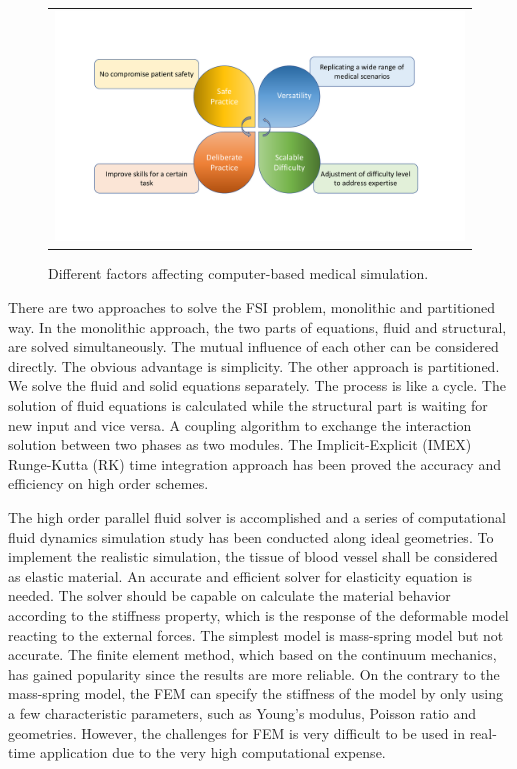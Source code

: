 \begin{figure}[H]
	\centering
	\begin{tabular}{c}
		\includegraphics[width=1.0\textwidth]{./pics/computer_simulation}
	\end{tabular}
	\caption{\footnotesize Different factors affecting computer-based medical simulation.} \label{fig: ch1f1}
\end{figure}

There are two approaches to solve the FSI problem, monolithic and partitioned way. In the monolithic approach, the two parts of equations, fluid and structural, are solved simultaneously. The mutual influence of each other can be considered directly. The obvious advantage is simplicity. The other approach is partitioned. We solve the fluid and solid equations separately. The process is like a cycle. The solution of fluid equations is calculated while the structural part is waiting for new input and vice versa. A coupling algorithm to exchange the interaction solution between two phases as two modules. The Implicit-Explicit (IMEX) Runge-Kutta (RK) time integration approach has been proved the accuracy and efficiency on high order schemes\cite{zhang2016high}.

The high order parallel fluid solver \cite{liang2007large, liang2007large, liang2009effect} is accomplished and a series of computational fluid dynamics simulation study has been conducted along ideal geometries. To implement the realistic simulation, the tissue of blood vessel shall be considered as elastic material. An accurate and efficient solver for elasticity equation is needed. The solver should be capable on calculate the material behavior according to the stiffness property, which is the response of the deformable model reacting to the external forces. The simplest model is mass-spring model but not accurate. The finite element method, which based on the continuum mechanics, has gained popularity since the results are more reliable. On the contrary to the mass-spring model, the FEM can specify the stiffness of the model by only using a few characteristic parameters, such as Young's modulus, Poisson ratio and geometries. However, the challenges for FEM is very difficult to be used in real-time application due to the very high computational expense. 

